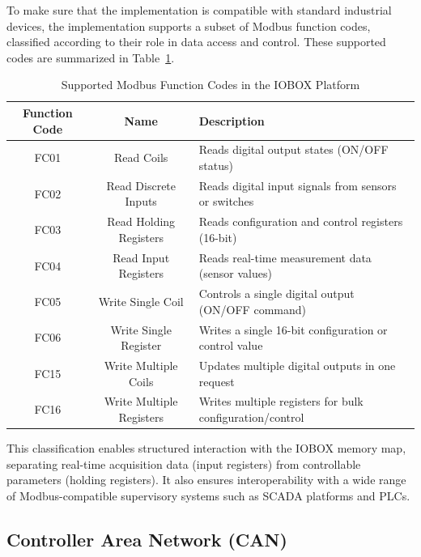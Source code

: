 To make sure that the implementation is compatible with standard industrial devices, the implementation supports a subset of Modbus function codes, classified according to their role in data access and control. These supported codes are summarized in Table~\ref{tab:modbus_function_codes}.
\begin{table}[H]
    \centering
    \caption{Supported Modbus Function Codes in the IOBOX Platform}
    \label{tab:modbus_function_codes}
    \begin{tabular}{|c|c|p{7cm}|}
    \hline
    \textbf{Function Code} & \textbf{Name} & \textbf{Description} \\
    \hline
    FC01 & Read Coils & Reads digital output states (ON/OFF status) \\
    \hline
    FC02 & Read Discrete Inputs & Reads digital input signals from sensors or switches \\
    \hline
    FC03 & Read Holding Registers & Reads configuration and control registers (16-bit) \\
    \hline
    FC04 & Read Input Registers & Reads real-time measurement data (sensor values) \\
    \hline
    FC05 & Write Single Coil & Controls a single digital output (ON/OFF command) \\
    \hline
    FC06 & Write Single Register & Writes a single 16-bit configuration or control value \\
    \hline
    FC15 & Write Multiple Coils & Updates multiple digital outputs in one request \\
    \hline
    FC16 & Write Multiple Registers & Writes multiple registers for bulk configuration/control \\
    \hline
    \end{tabular}
\end{table}

This classification enables structured interaction with the IOBOX memory map, separating real-time acquisition data (input registers) from controllable parameters (holding registers). It also ensures interoperability with a wide range of Modbus-compatible supervisory systems such as SCADA platforms and PLCs.

\subsection{Controller Area Network (CAN)}


